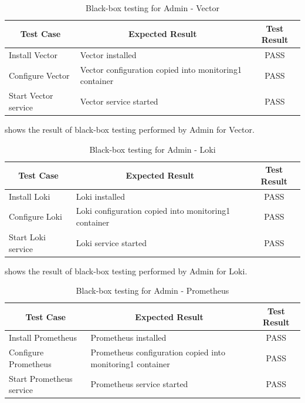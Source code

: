 \documentclass[../index.tex]{subfiles}
\begin{document}
\begin{table}[h!]
  \begin{tabularx}{\textwidth}{|m{8em}|X|c|} 
    \hline
    \multicolumn{1}{|c|}{Test Case} & \multicolumn{1}{c|}{Expected Result} & \multicolumn{1}{c|}{Test Result} \\
    \hline
    Install Vector                  & Vector installed                     & PASS \\ 
    Configure Vector                & Vector configuration copied into monitoring1 container & PASS \\
    Start Vector service            & Vector service started               & PASS \\ 
    \hline
  \end{tabularx}
  \caption{Black-box testing for Admin - Vector}
  \label{table:blackbox_vector}
\end{table}

 shows the result of black-box testing performed by Admin for Vector.

\begin{table}[h!]
  \begin{tabularx}{\textwidth}{|m{8em}|X|c|} 
    \hline
    \multicolumn{1}{|c|}{Test Case} & \multicolumn{1}{c|}{Expected Result} & \multicolumn{1}{c|}{Test Result} \\
    \hline
    Install Loki                    & Loki installed                       & PASS \\ 
    Configure Loki                  & Loki configuration copied into monitoring1 container & PASS \\
    Start Loki service              & Loki service started                 & PASS \\ 
    \hline
  \end{tabularx}
  \caption{Black-box testing for Admin - Loki}
  \label{table:blackbox_loki}
\end{table}

 shows the result of black-box testing performed by Admin for Loki.

\begin{table}[h!]
  \begin{tabularx}{\textwidth}{|m{12em}|X|c|} 
    \hline
    \multicolumn{1}{|c|}{Test Case} & \multicolumn{1}{c|}{Expected Result} & \multicolumn{1}{c|}{Test Result} \\
    \hline
    Install Prometheus              & Prometheus installed                 & PASS \\ 
    Configure Prometheus            & Prometheus configuration copied into monitoring1 container & PASS \\
    Start Prometheus service        & Prometheus service started           & PASS \\ 
    \hline
  \end{tabularx}
  \caption{Black-box testing for Admin - Prometheus}
  \label{table:blackbox_prometheus}
\end{table}
\end{document}
